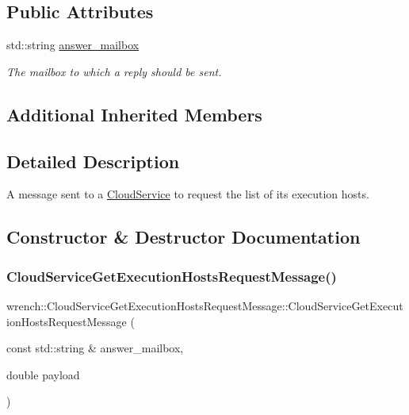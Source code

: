 \subsection*{Public Attributes}
\begin{DoxyCompactItemize}
\item 
\mbox{\label{classwrench_1_1_cloud_service_get_execution_hosts_request_message_a9d09cfc3866e41d291cd05280d820376}} 
std\+::string \hyperlink{classwrench_1_1_cloud_service_get_execution_hosts_request_message_a9d09cfc3866e41d291cd05280d820376}{answer\+\_\+mailbox}
\begin{DoxyCompactList}\small\item\em The mailbox to which a reply should be sent. \end{DoxyCompactList}\end{DoxyCompactItemize}
\subsection*{Additional Inherited Members}


\subsection{Detailed Description}
A message sent to a \hyperlink{classwrench_1_1_cloud_service}{Cloud\+Service} to request the list of its execution hosts. 

\subsection{Constructor \& Destructor Documentation}
\mbox{\label{classwrench_1_1_cloud_service_get_execution_hosts_request_message_a43a48eb6d951afe6cd655088a9a8fe8e}} 
\subsubsection{\texorpdfstring{Cloud\+Service\+Get\+Execution\+Hosts\+Request\+Message()}{CloudServiceGetExecutionHostsRequestMessage()}}
{\footnotesize\ttfamily wrench\+::\+Cloud\+Service\+Get\+Execution\+Hosts\+Request\+Message\+::\+Cloud\+Service\+Get\+Execution\+Hosts\+Request\+Message (\begin{DoxyParamCaption}\item[{const std\+::string \&}]{answer\+\_\+mailbox,  }\item[{double}]{payload }\end{DoxyParamCaption})}




